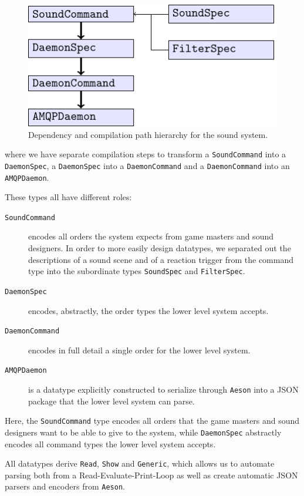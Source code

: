 \begin{figure}[H]
  \centering
  \includegraphics{figure}
  
  \caption{Dependency and compilation path hierarchy for the sound system.}
\label{fig:sshierarchy}
\end{figure}
where we have separate compilation steps to transform a \texttt{SoundCommand}
into a \texttt{DaemonSpec}, a \texttt{DaemonSpec} into a \texttt{DaemonCommand} and a
\texttt{DaemonCommand} into an \texttt{AMQPDaemon}.

These types all have different roles:
\begin{description}
\item[\tt SoundCommand] encodes all orders the system expects from
  game masters and sound designers. In order to more easily design
  datatypes, we separated out the descriptions of a sound scene and of
  a reaction trigger from the command type into the subordinate types
  \texttt{SoundSpec} and \texttt{FilterSpec}.
\item[\tt DaemonSpec] encodes, abstractly, the order types the lower
  level system accepts.
\item[\tt DaemonCommand] encodes in full detail a single order for the
  lower level system.
\item[\tt AMQPDaemon] is a datatype explicitly constructed to serialize
  through \texttt{Aeson} into a JSON package that the lower level
  system can parse.
\end{description}

Here, the \texttt{SoundCommand} type encodes all orders that the game
masters and sound designers want to be able to give to the system, while
\texttt{DaemonSpec} abstractly encodes all command types the lower
level system accepts.

All datatypes derive \texttt{Read}, \texttt{Show} and \texttt{Generic},
which allows us to automate parsing both from a Read-Evaluate-Print-Loop as well as
create automatic JSON parsers and encoders from \texttt{Aeson}. 

